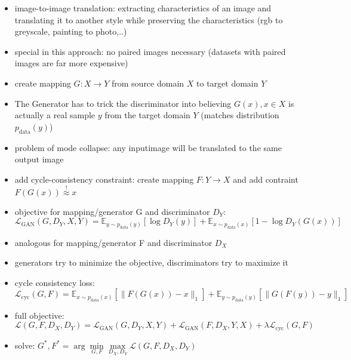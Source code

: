 \begin{itemize}
	\item image-to-image translation: extracting characteristics of an image and translating it to another style while preserving the characteristics (rgb to greyscale, painting to photo,..)
	\item special in this approach: no paired images necessary (datasets with paired images are far more expensive)
	\item create mapping $G: X \rightarrow Y$ from source domain $X$ to target domain $Y$
	\item The Generator has to trick the discriminator into believing $G(x), x \in X$ is actually a real sample $y$ from the target domain $Y$ (matches distribution $p_{\text{data}}(y)$)
	\item problem of mode collapse: any inputimage will be translated to the same output image
	\item add cycle-consistency constraint: create mapping $F: Y \rightarrow X$ and add contraint $F(G(x)) \overset{!}{\approx} x$ 
	\item objective for mapping/generator G and discriminator $D_Y$: \\
	$\mathcal{L}_{\text{GAN}}(G, D_Y, X, Y) = \mathbb{E}_{y\sim p_{\text{data}}(y)}[\log D_Y(y)] + \mathbb{E}_{x\sim p_{\text{data}}(x)}[1 - \log D_Y(G(x))]$
	\item analogous for mapping/generator F and discriminator $D_X$
	\item generators try to minimize the objective, discriminators try to maximize it
	\item cycle consistency loss:\\
	$\mathcal{L}_{\text{cyc}}(G, F) =  \mathbb{E}_{x\sim p_{\text{data}}(x)} [\lVert F(G(x))- x \rVert_1] + \mathbb{E}_{y\sim p_{\text{data}}(y)} [\lVert G(F(y))- y \rVert_1]$
	\item full objective:\\
	$\mathcal{L}(G,F,D_X,D_Y) = \mathcal{L}_{\text{GAN}}(G, D_Y, X, Y) + \mathcal{L}_{\text{GAN}}(F, D_X, Y, X) + \lambda \mathcal{L}_{\text{cyc}}(G, F)$
	\item solve: $G^*, F^* = \arg \underset{G,F}{\min}\underset{D_X, D_Y}{\max} \mathcal{L}(G,F,D_X,D_Y)$
\end{itemize}

